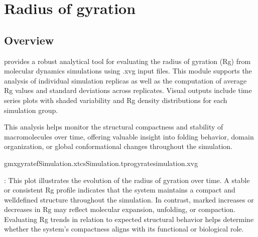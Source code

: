 \documentclass[a4paper,10pt,english]{sphinxmanual}
\begin{document}
\sphinxstepscope


\chapter{Radius of gyration}
\label{\detokenize{Rg:radius-of-gyration}}\label{\detokenize{Rg::doc}}

\section{Overview}
\label{\detokenize{Rg:overview}}
\sphinxAtStartPar
{} provides a robust analytical tool for evaluating the radius of gyration (Rg) from molecular dynamics simulations using .xvg input files. This module supports the analysis of individual simulation replicas as well as the computation of average Rg values and standard deviations across replicates. Visual outputs include time series plots with shaded variability and Rg density distributions for each simulation group.

\sphinxAtStartPar
This analysis helps monitor the structural compactness and stability of macromolecules over time, offering valuable insight into folding behavior, domain organization, or global conformational changes throughout the simulation.

\sphinxAtStartPar
{}

\begin{sphinxVerbatim}[commandchars=\\\{\}]
gmxgyrate\PYGZhy{}fSimulation.xtc\PYGZhy{}sSimulation.tpr\PYGZhy{}ogyrate\PYGZus{}simulation.xvg
\end{sphinxVerbatim}

\begin{sphinxVerbatim}[commandchars=\\\{\}]
   
\end{sphinxVerbatim}

\noindent{}

\sphinxAtStartPar
{}: This plot illustrates the evolution of the radius of gyration over time. A stable or consistent Rg profile indicates that the system maintains a compact and well\sphinxhyphen{}defined structure throughout the simulation. In contrast, marked increases or decreases in Rg may reflect molecular expansion, unfolding, or compaction. Evaluating Rg trends in relation to expected structural behavior helps determine whether the system’s compactness aligns with its functional or biological role.
\end{document}
